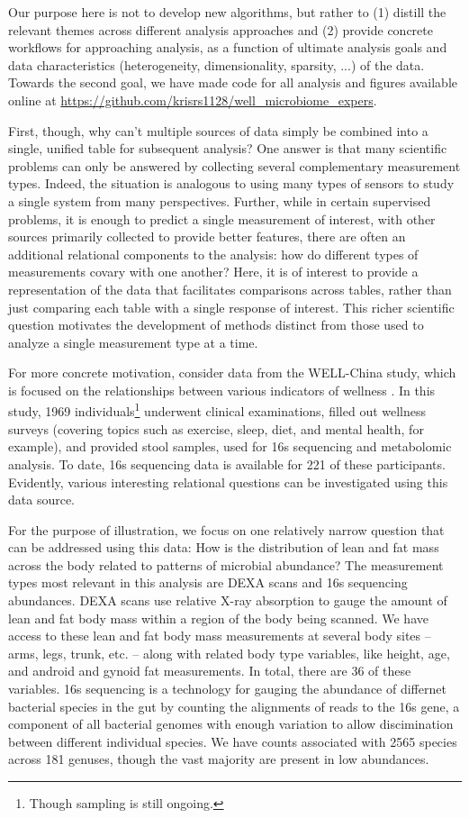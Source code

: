 \documentclass{article}
\begin{document}
Our purpose here is not to develop new algorithms, but rather to (1) distill the
relevant themes across different analysis approaches and (2) provide concrete
workflows for approaching analysis, as a function of ultimate analysis goals and
data characteristics (heterogeneity, dimensionality, sparsity, ...) of the data.
Towards the second goal, we have made code for all analysis and figures
available online at
\url{https://github.com/krisrs1128/well\_microbiome\_expers}.

First, though, why can't multiple sources of data simply be combined into a
single, unified table for subsequent analysis? One answer is that many
scientific problems can only be answered by collecting several complementary
measurement types. Indeed, the situation is analogous to using many types of
sensors to study a single system from many perspectives. Further, while in
certain supervised problems, it is enough to predict a single measurement of
interest, with other sources primarily collected to provide better features,
there are often an additional relational components to the analysis: how do
different types of measurements covary with one another? Here, it is of interest
to provide a representation of the data that facilitates comparisons across
tables, rather than just comparing each table with a single response of
interest. This richer scientific question motivates the development of methods
distinct from those used to analyze a single measurement type at a time.

For more concrete motivation, consider data from the WELL-China study, which is
focused on the relationships between various indicators of wellness
\citep{wellchina}. In this study, 1969 individuals\footnote{Though sampling is
  still ongoing.} underwent clinical examinations, filled out wellness surveys
(covering topics such as exercise, sleep, diet, and mental health, for example),
and provided stool samples, used for 16s sequencing and metabolomic analysis. To
date, 16s sequencing data is available for 221 of these participants. Evidently,
various interesting relational questions can be investigated using this data
source.

For the purpose of illustration, we focus on one relatively narrow question that
can be addressed using this data: How is the distribution of lean and fat mass
across the body related to patterns of microbial abundance? The measurement
types most relevant in this analysis are DEXA scans and 16s sequencing abundances.
DEXA scans use relative X-ray absorption to gauge the amount of lean and fat body
mass within a region of the body being scanned. We have access to these
lean and fat body mass measurements at several body sites -- arms, legs, trunk,
etc. -- along with related body type variables, like height, age, and android
and gynoid fat measurements. In total, there are 36 of these variables. 16s
sequencing is a technology for gauging the abundance of differnet bacterial
species in the gut by counting the alignments of reads to the 16s gene, a
component of all bacterial genomes with enough variation to allow discimination
between different individual species. We have counts associated with 2565
species across 181 genuses, though the vast majority are present in low
abundances.
\end{document}

